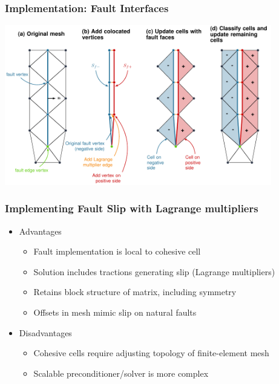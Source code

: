 \documentclass{beamer}
\begin{document}
\begin{frame}
  \frametitle{Implementation: Fault Interfaces}
 
  \begin{center}
    \includegraphics[height=7.0cm]{figs/cohesivecells}
  \end{center}
   
 \end{frame}
 

\begin{frame}
  \frametitle{Implementing Fault Slip with Lagrange multipliers}
 
 \begin{itemize}
 \item Advantages
   \begin{itemize}
   \item Fault implementation is local to cohesive cell
   \item Solution includes tractions generating slip (Lagrange multipliers)
   \item Retains block structure of matrix, including symmetry
   \item Offsets in mesh mimic slip on natural faults
   \end{itemize}
 \item Disadvantages 
   \begin{itemize}
   \item Cohesive cells require adjusting topology of finite-element
     mesh
   \item Scalable preconditioner/solver is more complex
  \end{itemize}
 \end{itemize}
  
\end{frame}
\end{document}
